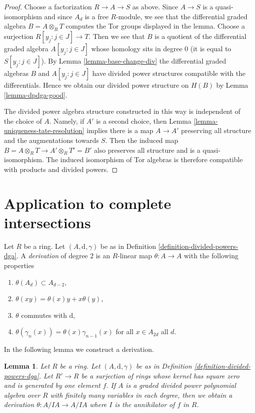 \documentclass{stacks-project}
\theoremstyle{plain}
\newtheorem{lemma}[subsection]{Lemma}
\theoremstyle{definition}
\theoremstyle{remark}
\numberwithin{equation}{subsection}
\begin{document}
\begin{proof}
Choose a factorization $R \to A \to S$ as above. Since $A \to S$
is a quasi-isomorphism and since $A_d$ is a free $R$-module,
we see that the differential graded algebra $B = A \otimes_R T$ computes
the Tor groups displayed in the lemma. Choose a surjection
$R[y_j:j\in J] \to T$. Then we see that
$B$ is a quotient of the differential graded algebra
$A[y_j:j\in J]$ whose homology sits in degree $0$ (it is equal
to $S[y_j:j\in J]$).
By Lemma \ref{lemma-base-change-div} the differential graded algebras $B$ and
$A[y_j:j\in J]$ have divided power structures compatible
with the differentials. Hence we obtain our divided
power structure on $H(B)$ by Lemma \ref{lemma-dpdga-good}.

\medskip\noindent
The divided power algebra structure constructed in this way is independent
of the choice of $A$. Namely, if $A'$ is a second choice, then
Lemma \ref{lemma-uniqueness-tate-resolution}
implies there is a map $A \to A'$ preserving all structure and the
augmentations towards $S$. Then the induced map
$B = A \otimes_R T \to A' \otimes_R T' = B'$ also preserves
all structure
and is a quasi-isomorphism. The induced isomorphism of
Tor algebras is therefore compatible with products
and divided powers.
\end{proof}





\section{Application to complete intersections}
\label{section-application-ci}

\noindent
Let $R$ be a ring. Let $(A, \text{d}, \gamma)$ be as in
Definition \ref{definition-divided-powers-dga}.
A {\it derivation} of degree $2$ is an $R$-linear
map $\theta : A \to A$ with the following
properties
\begin{enumerate}
\item $\theta(A_d) \subset A_{d - 2}$,
\item $\theta(xy) = \theta(x)y + x\theta(y)$,
\item $\theta$ commutes with $\text{d}$,
\item $\theta(\gamma_n(x)) = \theta(x) \gamma_{n - 1}(x)$
for all $x \in A_{2d}$ all $d$.
\end{enumerate}
In the following lemma we construct a derivation.

\begin{lemma}
\label{lemma-get-derivation}
Let $R$ be a ring. Let $(A, \text{d}, \gamma)$ be as in
Definition \ref{definition-divided-powers-dga}.
Let $R' \to R$ be a surjection of rings whose kernel
has square zero and is generated by one element $f$.
If $A$ is a graded divided power polynomial algebra over $R$
with finitely many variables in each degree,
then we obtain a derivation
$\theta : A/IA \to A/IA$ where $I$ is the annihilator
of $f$ in $R$.
\end{lemma}
\end{document}
